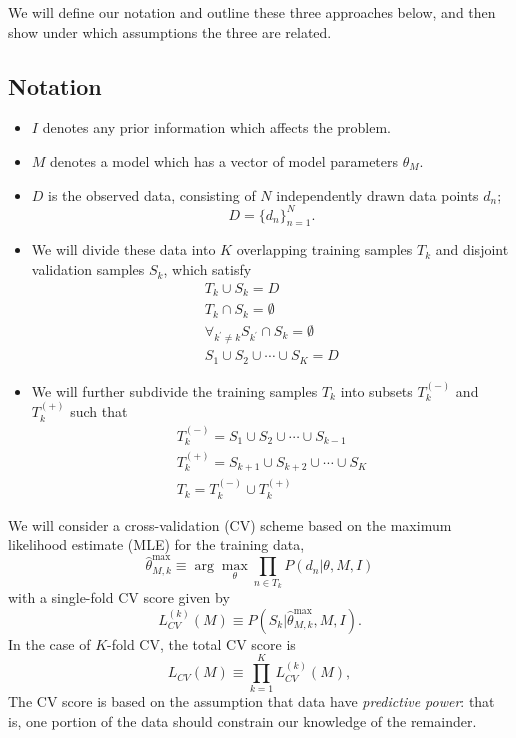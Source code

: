 \documentclass[12pt]{article}
\newcommand{\thetamax}[1]{\ensuremath{\hat{\theta}^{\max}_{#1}}}
\newcommand{\LCV}[1]{\ensuremath{L_{CV}}(#1)}
\newcommand{\LCVk}[1]{\ensuremath{L^{(k)}_{CV}}(#1)}
\newcommand{\Tkplus}{\ensuremath{T_k^{(+)}}}
\newcommand{\Tkminus}{\ensuremath{T_k^{(-)}}}
\begin{document}
We will define our notation and outline these three approaches below, and
then show under which assumptions the three are related.

\subsection{Notation}
\begin{itemize}
  \item $I$ denotes any prior information which affects the problem.
  \item $M$ denotes a model which has a vector of model parameters $\theta_M$.
  \item $D$ is the observed data, consisting of $N$ independently drawn
    data points $d_n$;
    \begin{equation}
      D = \{d_n\}_{n=1}^N.
    \end{equation}
  \item  We will divide these data into $K$ overlapping training samples
    $T_k$ and disjoint validation samples $S_k$, which satisfy
    \begin{eqnarray}
      T_k \cup S_k = D\\
      T_k \cap S_k = \emptyset\\
      \forall_{k^\prime \ne k} S_{k^\prime} \cap S_k = \emptyset\\
      S_1 \cup S_2 \cup \cdots \cup S_K = D
    \end{eqnarray}
  \item We will further subdivide the training samples $T_k$ into subsets
    \Tkminus{} and \Tkplus{} such that
    \begin{eqnarray}
      \Tkminus = S_1 \cup S_2 \cup \cdots \cup S_{k-1}\\
      \Tkplus = S_{k+1} \cup S_{k+2} \cup \cdots \cup S_K\\
      T_k = \Tkminus \cup \Tkplus
    \end{eqnarray}
\end{itemize}

We will consider a cross-validation (CV) scheme based on the 
maximum likelihood estimate (MLE) for the training data,
\begin{equation}
  \thetamax{M,k} \equiv \arg\max_\theta \prod_{n \in T_k} P(d_n|\theta, M, I)
\end{equation}
with a single-fold CV score given by
\begin{equation}
  \label{eq:LCVk}
  \LCVk{M} \equiv P(S_k | \thetamax{M,k}, M, I).
\end{equation}
In the case of $K$-fold CV, the total CV score is
\begin{equation}
  \label{eq:LCV}
  \LCV{M} \equiv \prod_{k=1}^K \LCVk{M},
\end{equation}
The CV score is based on the assumption that data have {\it predictive power}:
that is, one portion of the data should constrain our knowledge of the
remainder.
\end{document}
